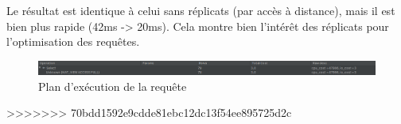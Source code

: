 \documentclass[10pt,a4paper]{article}
\theoremstyle{plain}
\begin{document}
\inputminted{sql}{INSA-DB12-EuropeNord-replicats-tests.sql}

Le résultat est identique à celui sans réplicats (par accès à distance), mais il est bien plus rapide (42ms -> 20ms). Cela montre bien l'intérêt des réplicats pour l'optimisation des requêtes.

\begin{figure}[H]
    \centering
    \includegraphics[width=15cm]{INSA-DB12-EuropeNord-plan-exec-vues-replicat-produits.png}
    \caption{Plan d'exécution de la requête}
\end{figure}

>>>>>>> 70bdd1592e9cdde81ebc12dc13f54ee895725d2c
\end{document}
